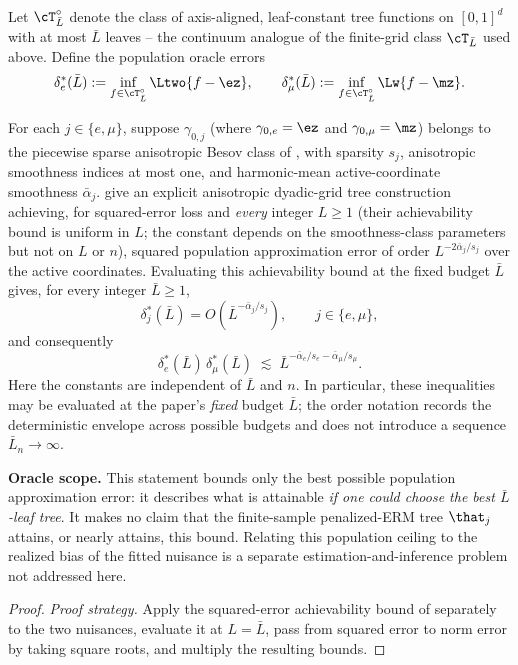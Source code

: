 \begin{remark}\label{rem:pshab-fixed-budget}
Let $\cT_{\bar L}^{\circ}$ denote the class of axis-aligned, leaf-constant tree
functions on $[0,1]^d$ with at most $\bar L$ leaves -- the continuum analogue
of the finite-grid class $\cT_{\bar L}$ used above. Define the population
oracle errors
\[
  \delta_e^*(\bar L)
  :=\inf_{f\in\cT_{\bar L}^{\circ}}\Ltwo{f-\ez},
  \qquad
  \delta_\mu^*(\bar L)
  :=\inf_{f\in\cT_{\bar L}^{\circ}}\Lw{f-\mz}.
\]

For each $j\in\{e,\mu\}$, suppose $\gamma_{0,j}$ (where $\gamma_{0,e}=\ez$ and
$\gamma_{0,\mu}=\mz$) belongs to the piecewise sparse anisotropic Besov
class of \citet[Definition~4.5]{xu2026}, with sparsity $s_j$, anisotropic
smoothness indices at most one, and harmonic-mean active-coordinate smoothness
$\bar\alpha_j$. \citet[Theorems~5.5 and~6.1]{xu2026} give an explicit
anisotropic dyadic-grid tree construction achieving, for squared-error loss
and \emph{every} integer $L\ge1$ (their achievability bound is uniform in $L$;
the constant depends on the smoothness-class parameters but not on $L$ or
$n$), squared population approximation error of order $L^{-2\bar\alpha_j/s_j}$
over the active coordinates. Evaluating this achievability bound at the fixed
budget $\bar L$ gives, for every integer $\bar L\ge1$,
\[
  \delta_j^*(\bar L)
  =O\!\left(\bar L^{-\bar\alpha_j/s_j}\right),
  \qquad j\in\{e,\mu\},
\]
and consequently
\[
  \delta_e^*(\bar L)\,\delta_\mu^*(\bar L)
  \;\lesssim\;
  \bar L^{-\bar\alpha_e/s_e-\bar\alpha_\mu/s_\mu}.
\]
Here the constants are independent of $\bar L$ and $n$.  In particular, these
inequalities may be evaluated at the paper's \emph{fixed} budget $\bar L$;
the order notation records the deterministic envelope across possible budgets
and does not introduce a sequence $\bar L_n\to\infty$.

\textbf{Oracle scope.}
This statement bounds only the best possible population approximation error:
it describes what is attainable \emph{if one could choose the best
$\bar L$-leaf tree}.  It makes no claim that the finite-sample penalized-ERM
tree $\that_j$ attains, or nearly attains, this bound.  Relating this population
ceiling to the realized bias of the fitted nuisance is a separate
estimation-and-inference problem not addressed here.

\begin{proof}
\emph{Proof strategy.}
Apply the squared-error achievability bound of \citet[Thms.~5.5,
6.1]{xu2026} separately to the two nuisances, evaluate it at $L=\bar L$, pass
from squared error to norm error by taking square roots, and multiply the
resulting bounds.


\end{proof}
\end{remark}
